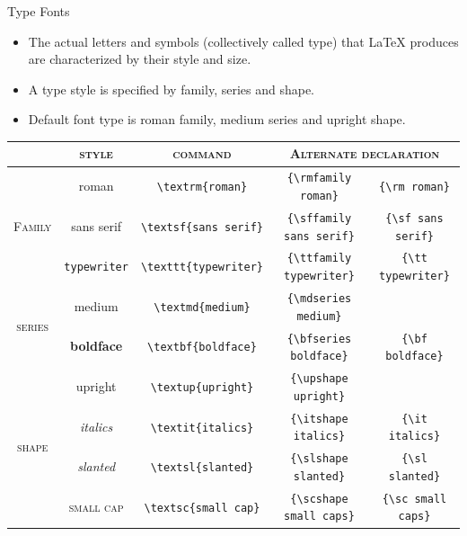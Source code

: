 \documentclass[style=lehigh,orient=landscape]{powerdot}
\begin{document}
\begin{wideslide}[method=direct]{Type Fonts}
  \begin{itemize}
  \item The actual letters and symbols (collectively called type) that LaTeX produces are characterized by their style and size.
  \item A type style is specified by family, series and shape.
  \item Default font type is roman family, medium series and upright shape.
  \end{itemize}
  \begin{center}
    \begin{tabular}{|c|c|c|c|c|}
      \cline{2-5}
      \multicolumn{1}{c}{} & \multicolumn{1}{|c|}{\textsc{style}} & \multicolumn{1}{|c|}{\textsc{command}} & \multicolumn{2}{|c|}{\textsc{Alternate declaration}}\\
      \hline
      \multirow{3}{*}{\textsc{Family}} & \textrm{roman} & \lstinline|\textrm{roman}| & \lstinline|{\rmfamily roman}| & \lstinline|{\rm roman}|\\
      & \textsf{sans serif} & \lstinline|\textsf{sans serif}| & \lstinline|{\sffamily sans serif}| & \lstinline|{\sf sans serif}|\\
      & \texttt{typewriter} & \lstinline|\texttt{typewriter}| & \lstinline|{\ttfamily typewriter}| & \lstinline|{\tt typewriter}|\\
      \hline
      \multirow{2}{*}{\textsc{series}} & \textmd{medium} & \lstinline|\textmd{medium}| & \lstinline|{\mdseries medium}| & \\
      & \textbf{boldface} & \lstinline|\textbf{boldface}| & \lstinline|{\bfseries boldface}| & \lstinline|{\bf boldface}|\\
      \hline
      \multirow{4}{*}{\textsc{shape}} & \textup{upright} & \lstinline|\textup{upright}| & \lstinline|{\upshape upright}| & \\
      & \textit{italics} & \lstinline|\textit{italics}| & \lstinline|{\itshape italics}| & \lstinline|{\it italics}|\\
      & \textsl{slanted} & \lstinline|\textsl{slanted}| & \lstinline|{\slshape slanted}| & \lstinline|{\sl slanted}|\\
      & \textsc{small cap} & \lstinline|\textsc{small cap}| & \lstinline|{\scshape small caps}| & \lstinline|{\sc small caps}|\\
      \hline
    \end{tabular}
  \end{center}
\end{wideslide}
\end{document}
